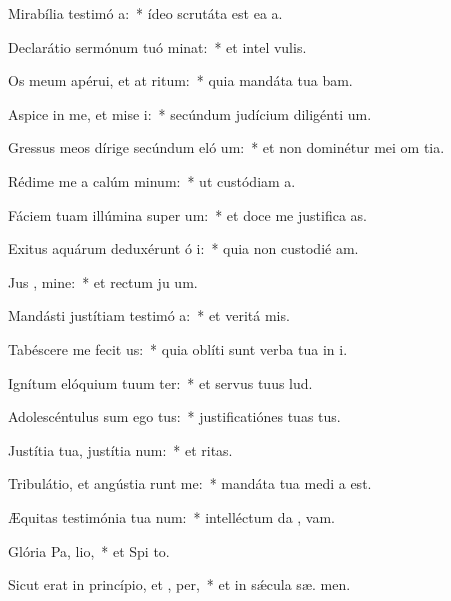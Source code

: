 \item Mirabília testimó a:~* ídeo scrutáta est ea  a.
\item Declarátio sermónum tuó minat:~* et intel  vulis.
\item Os meum apérui, et at ritum:~* quia mandáta tua bam.
\item Aspice in me, et mise i:~* secúndum judícium diligénti  um.
\item Gressus meos dírige secúndum eló um:~* et non dominétur mei om tia.
\item Rédime me a calúm minum:~* ut custódiam  a.
\item Fáciem tuam illúmina super  um:~* et doce me justifica as.
\item Exitus aquárum deduxérunt ó i:~* quia non custodié  am.
\item Jus , mine:~* et rectum ju um.
\item Mandásti justítiam testimó a:~* et veritá  mis.
\item Tabéscere me fecit  us:~* quia oblíti sunt verba tua in i.
\item Ignítum elóquium tuum ter:~* et servus tuus  lud.
\item Adolescéntulus sum ego  tus:~* justificatiónes tuas   tus.
\item Justítia tua, justítia  num:~* et   ritas.
\item Tribulátio, et angústia runt me:~* mandáta tua medi a est.
\item Æquitas testimónia tua  num:~* intelléctum da ,  vam.
\item Glória Pa,  lio,~* et Spi to.
\item Sicut erat in princípio, et ,  per,~* et in sǽcula sæ. men.
